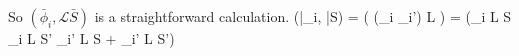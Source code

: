 \documentclass[Dissertation.tex]{subfiles}
\begin{document}
%
%
%
%
%
%
%
%
%

So $(\bar{\phi}_i, \mathcal{L}\bar{S})$ is a straightforward calculation.
\beq
\label{eq:PhiBarLSBar1}
(\bar{\phi}_i, \bar{S}) = \left( (\phi_i \pm \phi_i') L \right)
=  \left(\phi_i L S \pm \phi_i L S' \pm \phi_i' L S + \phi_i' L S'\right)
\eeq
\end{document}
